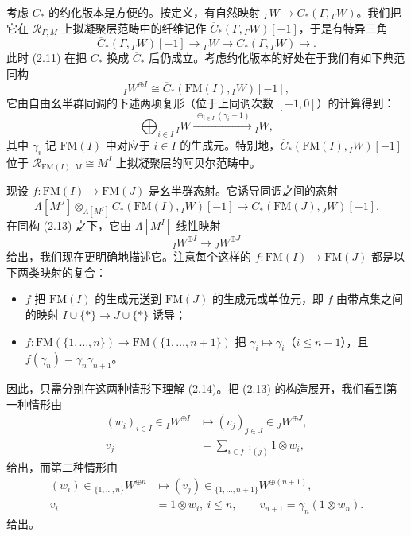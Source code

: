 考虑 $C_*$ 的约化版本是方便的。按定义，有自然映射 ${}_\Gamma W\to C_*(\Gamma,{}_\Gamma W)$。我们把它在 $\mathcal R_{\Gamma,M}$ 上拟凝聚层范畴中的纤维记作 $\overline{C}_*(\Gamma,{}_\Gamma W)[-1]$，于是有特异三角
\begin{equation}\tag{2.12}
\overline{C}_*(\Gamma,{}_\Gamma W)[-1]\to{}_\Gamma W\to C_*(\Gamma,{}_\Gamma W)\to .
\end{equation}
此时 (2.11) 在把 $C_*$ 换成 $\overline{C}_*$ 后仍成立。考虑约化版本的好处在于我们有如下典范同构
\begin{equation}\tag{2.13}
{}_I W^{\oplus I}\cong\overline{C}_*(\mathrm{FM}(I),{}_I W)[-1],
\end{equation}
它由自由幺半群同调的下述两项复形（位于上同调次数 $[-1,0]$）的计算得到：
\[
\bigoplus_{i\in I}{}_I W\xrightarrow{\ \oplus_{i\in I}(\gamma_i-1)\ }{}_I W,
\]
其中 $\gamma_i$ 记 $\mathrm{FM}(I)$ 中对应于 $i\in I$ 的生成元。特别地，$\overline{C}_*(\mathrm{FM}(I),{}_I W)[-1]$ 位于 $\mathcal R_{\mathrm{FM}(I),M}\cong M^I$ 上拟凝聚层的阿贝尔范畴中。

现设 $f:\mathrm{FM}(I)\to\mathrm{FM}(J)$ 是幺半群态射。它诱导同调之间的态射
\[
\Lambda[M^J]\otimes_{\Lambda[M^I]}\overline{C}_*(\mathrm{FM}(I),{}_I W)[-1]
\to\overline{C}_*(\mathrm{FM}(J),{}_J W)[-1].
\]
在同构 (2.13) 之下，它由 $\Lambda[M^I]$-线性映射
\begin{equation}\tag{2.14}
{}_I W^{\oplus I}\to{}_J W^{\oplus J}
\end{equation}
给出，我们现在更明确地描述它。注意每个这样的 $f:\mathrm{FM}(I)\to\mathrm{FM}(J)$ 都是以下两类映射的复合：
\begin{itemize}[leftmargin=1.6em,itemsep=0.2em]
\item $f$ 把 $\mathrm{FM}(I)$ 的生成元送到 $\mathrm{FM}(J)$ 的生成元或单位元，即 $f$ 由带点集之间的映射 $I\cup\{*\}\to J\cup\{*\}$ 诱导；
\item $f:\mathrm{FM}(\{1,\dots,n\})\to\mathrm{FM}(\{1,\dots,n+1\})$ 把 $\gamma_i\mapsto\gamma_i$（$i\le n-1$），且 $f(\gamma_n)=\gamma_n\gamma_{n+1}$。
\end{itemize}

因此，只需分别在这两种情形下理解 (2.14)。把 (2.13) 的构造展开，我们看到第一种情形由
\begin{equation}\tag{2.15}
\begin{aligned}
(w_i)_{i\in I}\in{}_I W^{\oplus I}&\mapsto(v_j)_{j\in J}\in{}_J W^{\oplus J},\\
v_j&=\sum_{i\in f^{-1}(j)}1\otimes w_i,
\end{aligned}
\end{equation}
给出，而第二种情形由
\begin{equation}\tag{2.16}
\begin{aligned}
(w_i)\in{}_{\{1,\dots,n\}}W^{\oplus n}&\mapsto(v_j)\in{}_{\{1,\dots,n+1\}}W^{\oplus(n+1)},\\
v_i&=1\otimes w_i,\ i\le n,\qquad v_{n+1}=\gamma_n(1\otimes w_n).
\end{aligned}
\end{equation}
给出。

